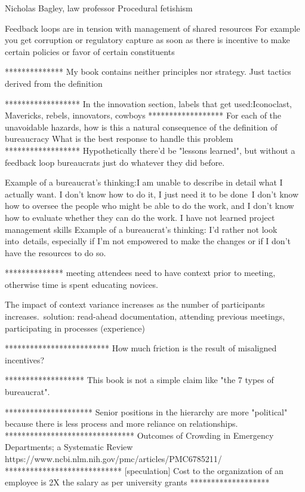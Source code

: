 Nicholas Bagley, law professor
Procedural fetishism

Feedback loops are in tension with management of shared resources
For example you get corruption or regulatory capture as soon as there is incentive to make certain policies or favor of certain constituents

**************
My book contains neither principles nor strategy. Just tactics derived from the definition

******************
In the innovation section, labels that get used:Iconoclast, Mavericks, rebels, innovators, cowboys
******************
For each of the unavoidable hazards, how is this a natural consequence of the definition of bureaucracy
What is the best response to handle this problem
******************
Hypothetically there'd be "lessons learned", but without a feedback loop bureaucrats just do whatever they did before. 

Example of a bureaucrat's thinking:I am unable to describe in detail what I actually want. I don't know how to do it, I just need it to be done I don't know how to oversee the people who might be able to do the work, and I don't know how to evaluate whether they can do the work. I have not learned project management skills
Example of a bureaucrat's thinking:
I'd rather not look into details, especially if I'm not empowered to make the changes or if I don't have the resources to do so.

**************
meeting attendees need to have context prior to meeting, otherwise time is spent educating novices. 

The impact of context variance increases as the number of participants increases. solution: read-ahead documentation, attending previous meetings, participating in processes (experience)

*************************
How much friction is the result of misaligned incentives?

*******************
This book is not a simple claim like "the 7 types of bureaucrat". 

*********************
Senior positions in the hierarchy are more "political" because there is less process and more reliance on relationships.
*******************************
Outcomes of Crowding in Emergency Departments; a Systematic Review
https://www.ncbi.nlm.nih.gov/pmc/articles/PMC6785211/ 
****************************
[speculation] Cost to the organization of an employee is 2X the salary as per university grants
*******************

